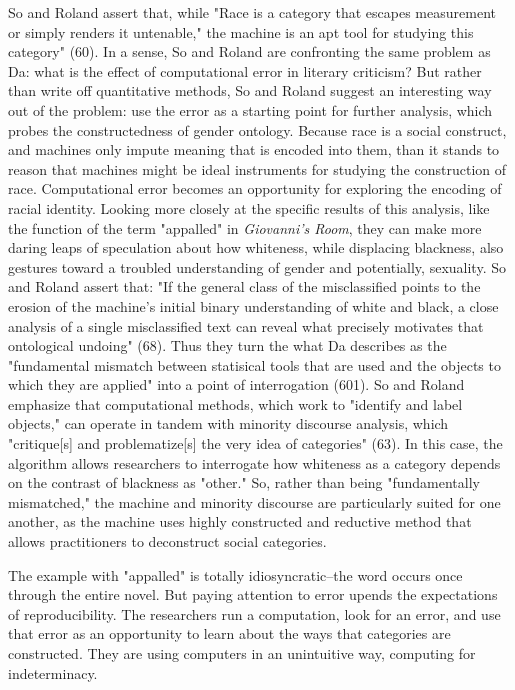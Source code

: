 \documentclass[11pt]{article}
\begin{document}
So and Roland assert that, while "Race is a category that escapes
measurement or simply renders it untenable," the machine is an apt
tool for studying this category" (60). In a sense, So and Roland are
confronting the same problem as Da: what is the effect of
computational error in literary criticism? But rather than write off
quantitative methods, So and Roland suggest an interesting way out of
the problem: use the error as a starting point for further analysis,
which probes the constructedness of gender ontology. Because race is a
social construct, and machines only impute meaning that is encoded
into them, than it stands to reason that machines might be ideal
instruments for studying the construction of race. Computational error
becomes an opportunity for exploring the encoding of racial
identity. Looking more closely at the specific results of this
analysis, like the function of the term "appalled" in \emph{Giovanni's
Room}, they can make more daring leaps of speculation about how
whiteness, while displacing blackness, also gestures toward a troubled
understanding of gender and potentially, sexuality. So and Roland
assert that: "If the general class of the misclassified points to the
erosion of the machine's initial binary understanding of white and
black, a close analysis of a single misclassified text can reveal what
precisely motivates that ontological undoing" (68). Thus they turn the
what Da describes as the "fundamental mismatch between statisical
tools that are used and the objects to which they are applied" into a
point of interrogation (601). So and Roland emphasize that
computational methods, which work to "identify and label objects," can
operate in tandem with minority discourse analysis, which "critique[s]
and problematize[s] the very idea of categories" (63). In this case,
the algorithm allows researchers to interrogate how whiteness as a
category depends on the contrast of blackness as "other." So, rather
than being "fundamentally mismatched," the machine and minority
discourse are particularly suited for one another, as the machine uses
highly constructed and reductive method that allows practitioners to
deconstruct social categories.

The example with "appalled" is totally idiosyncratic--the word occurs
once through the entire novel. But paying attention to error upends
the expectations of reproducibility. The researchers run a
computation, look for an error, and use that error as an opportunity
to learn about the ways that categories are constructed. They are
using computers in an unintuitive way, computing for indeterminacy.
\end{document}
